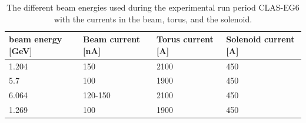 \begin{table}[!h]
   \centering
   \begin{center}
      \begin{tabular}{|l|l|l|l|}
         \hline
         beam energy [GeV] & Beam current [nA] & Torus current [A] & Solenoid 
         current [A] \\ \hline
         1.204 & 150 & 2100 & 450 \\
         \hline
         5.7  & 100 & 1900 & 450 \\
         \hline
         6.064 & 120-150 & 2100 & 450\\
         \hline
         1.269  & 100 & 1900 & 450\\
         \hline
      \end{tabular}
      \caption{The different beam energies used during the experimental run 
      period CLAS-EG6 with the currents in the beam, torus, and the solenoid. }
      \label{table:eg6_char}
   \end{center}
\end{table}

